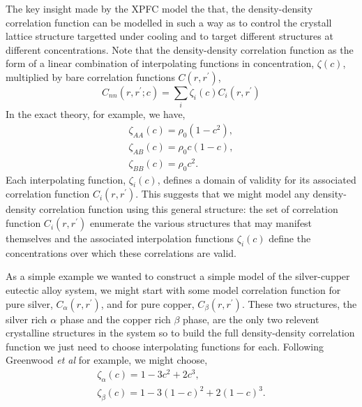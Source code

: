 The key insight made by the XPFC model the that, the density-density correlation 
function can be modelled in such a way as to control the crystall lattice structure
targetted under cooling and to target different structures at different concentrations.
Note that the density-density correlation function as the form of a linear combination
of interpolating functions in concentration, $\zeta(c)$, multiplied by bare correlation
functions $C(r, r^\prime)$,
%
\begin{equation}
    C_{nn}(r, r^\prime; c) = \sum_i \zeta_i(c) C_i(r, r^\prime)
\end{equation}
%
In the exact theory, for example, we have,
%
\begin{gather}
    \zeta_{AA}(c) = \rho_0 (1 - c^2), \\
    \zeta_{AB}(c) = \rho_0 c (1 - c ), \\
    \zeta_{BB}(c) = \rho_0 c^2.
\end{gather}
%
Each interpolating function, $\zeta_i(c)$, defines a domain of validity for its
associated correlation function $C_i(r, r^\prime)$. This suggests that we might
model any density-density correlation function using this general structure:
the set of correlation function $C_i(r, r^\prime)$ enumerate the various
structures that may manifest themselves and the associated interpolation
functions $\zeta_i(c)$ define the concentrations over which these correlations
are valid.

As a simple example we wanted to construct a simple model of the silver-cupper
eutectic alloy system, we might start with some model correlation function for
pure silver, $C_\alpha(r, r^\prime)$, and for pure copper, $C_\beta(r,
r^\prime)$. These two structures, the silver rich $\alpha$ phase and the copper
rich $\beta$ phase, are the only two relevent crystalline structures in the
system so to build the full density-density correlation function we just need
to choose interpolating functions for each. Following Greenwood \textit{et al}
for example, we might choose,
%
\begin{gather}
    \zeta_\alpha(c) = 1 - 3c^2 + 2c^3, \\
    \zeta_\beta(c) = 1 - 3 (1 - c)^2 + 2(1 - c)^3.
\end{gather}
%

